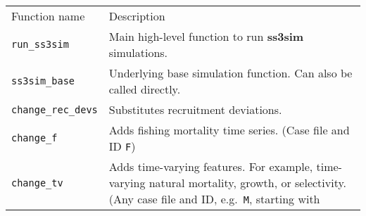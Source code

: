\documentclass[10pt]{article}
\begin{document}
\begin{longtable}[c]{@{}ll@{}}
\hline\noalign{\medskip}
\begin{minipage}[b]{0.32\columnwidth}\raggedright
Function name
\end{minipage} & \begin{minipage}[b]{0.57\columnwidth}\raggedright
Description
\end{minipage}
\\\noalign{\medskip}
\hline\noalign{\medskip}
\begin{minipage}[t]{0.32\columnwidth}\raggedright
\texttt{run\_ss3sim}
\end{minipage} & \begin{minipage}[t]{0.57\columnwidth}\raggedright
Main high-level function to run \textbf{ss3sim} simulations.
\end{minipage}
\\\noalign{\medskip}
\begin{minipage}[t]{0.32\columnwidth}\raggedright
\texttt{ss3sim\_base}
\end{minipage} & \begin{minipage}[t]{0.57\columnwidth}\raggedright
Underlying base simulation function. Can also be called directly.
\end{minipage}
\\\noalign{\medskip}
\begin{minipage}[t]{0.32\columnwidth}\raggedright
\texttt{change\_rec\_devs}
\end{minipage} & \begin{minipage}[t]{0.57\columnwidth}\raggedright
Substitutes recruitment deviations.
\end{minipage}
\\\noalign{\medskip}
\begin{minipage}[t]{0.32\columnwidth}\raggedright
\texttt{change\_f}
\end{minipage} & \begin{minipage}[t]{0.57\columnwidth}\raggedright
Adds fishing mortality time series. (Case file and ID \texttt{F})
\end{minipage}
\\\noalign{\medskip}
\begin{minipage}[t]{0.32\columnwidth}\raggedright
\texttt{change\_tv}
\end{minipage} & \begin{minipage}[t]{0.57\columnwidth}\raggedright
Adds time-varying features. For example, time-varying natural mortality,
growth, or selectivity. (Any case file and ID, e.g.~\texttt{M}, starting with

\end{minipage}
\end{longtable}
\end{document}
